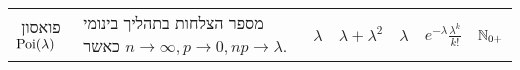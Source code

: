 \documentclass[8pt,twocolumn]{extarticle}
\begin{document}
{{\begin{minipage}{\columnwidth}
\begin{sideways}
\begin{tabular}{ R{1.7cm} | R{2.8cm} | c | C{2.1cm} | c | C{2.1cm} | C{1.5cm}}
          פואסון
          \hspace*{\fill}‏\(\operatorname{Poi}(\lambda)\)
                   & מספר הצלחות בתהליך בינומי כאשר ‎\(n\to \infty , p\to 0, n p\to \lambda \).
          & ‎\(\lambda \)
                  & ‎\(\lambda + \lambda^2\)
                            & ‎\(\lambda\)
                                     & ‎\(e^{-\lambda} \frac{\lambda^k}{k!}\)
                                                  & ‎\(\mathbb{N}_{0+}\)
        \end{tabular}
\end{sideways}
\end{minipage}}}
\fi
\end{document}
